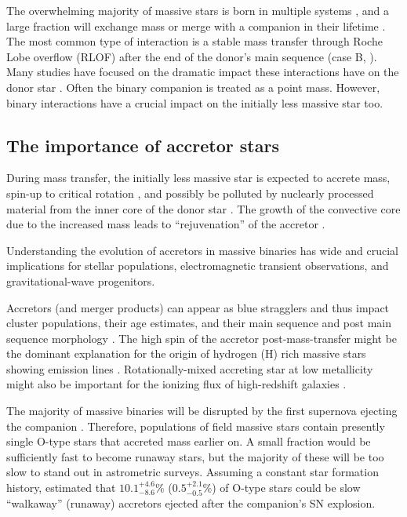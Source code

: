 \documentclass[twocolumn,twocolappendix,trackchanges]{aastex63}
\newcommand{\todo}[1]{{\large $\blacksquare$~\textbf{\color{red}[#1]}}~$\blacksquare$}
\begin{document}
The overwhelming majority of massive stars is born in multiple systems
\citep[e.g.,][]{mason:09, almeida:17}, and a large fraction will
exchange mass or merge with a companion in their lifetime
\citep[e.g.,][]{sana:12}. The most common type of interaction is a
stable mass transfer through Roche Lobe overflow (RLOF) after the end of the donor's main sequence (case
B, \citealt{kippenhahn:67}).  Many
studies %
have focused on the dramatic impact these interactions have on the
donor star \citep[e.g.,][]{morton:60, yoon:17, gotberg:17, gotberg:18, laplace:20,
  laplace:21, blagorodnova:21}. Often the binary companion is treated as a point mass.
However, binary interactions have a crucial impact on the initially
less massive star too.

\subsection{The importance of accretor stars}

During mass transfer, the initially less massive star is expected to
accrete mass, spin-up to critical rotation
\citep[e.g.,][]{packet:81}, and possibly be polluted by
nuclearly processed material from the inner core of the donor star
\citep[e.g.,][]{blaauw:93}. The growth of
the convective core due to the increased mass leads to
``rejuvenation'' of the accretor \citep[e.g.,][]{neo:77, schneider:16}.

Understanding the evolution of accretors in massive binaries has wide
and crucial implications for stellar populations, electromagnetic
transient observations, and gravitational-wave progenitors.

Accretors
(and merger products) can appear as blue stragglers
\citep[e.g.,][]{chen:09, chen:10, rain:21} and thus impact cluster
populations, their age estimates, and their main sequence
\citep[e.g.,][]{pols_marinus:94, wang:20} and post main sequence morphology
\citep[e.g.,][]{wei:21}. The high spin of the
accretor post-mass-transfer might be the dominant explanation for the origin of
hydrogen (H) rich massive stars showing emission lines
\citep[e.g.,][]{pols:91, bodensteiner:20,
  vinciguerra:20, dorigo-jones:20, wang:21_sdOBe}. Rotationally-mixed accreting
star at low metallicity might also be important for the ionizing flux of high-redshift
galaxies \citep[e.g.,][]{eldridge:12}.

The majority of massive binaries will be
disrupted by the first supernova ejecting the companion
\citep[``binary SN scenario'', ][]{blaauw:61, dedonder:97,
  eldridge:11, boubert:18, renzo:19walk, evans:20}. Therefore,
populations of field massive stars contain presently single O-type
stars that accreted mass earlier on. A small fraction would be
sufficiently fast to become runaway stars, but the majority of these will be too
slow to stand out in astrometric surveys. Assuming a constant star
formation history, \cite{renzo:19walk} estimated that
$10.1^{+4.6}_{-8.6}\%$ ($0.5^{+2.1}_{-0.5}\%$) of O-type stars could
be slow ``walkaway'' (runaway) accretors
ejected after the companion's SN explosion.
\end{document}
